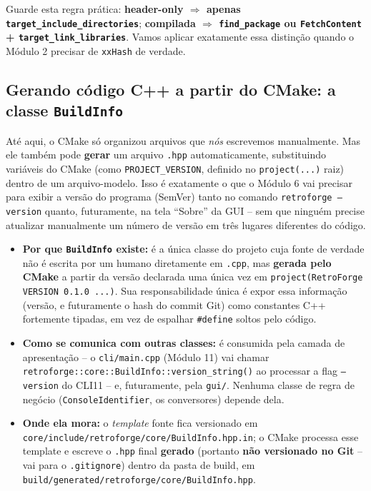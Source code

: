 \begin{CaixaInfo}
Guarde esta regra prática: \textbf{header-only $\Rightarrow$ apenas \texttt{target\_include\_directories}}; \textbf{compilada $\Rightarrow$ \texttt{find\_package} ou \texttt{FetchContent} + \texttt{target\_link\_libraries}}. Vamos aplicar exatamente essa distinção quando o Módulo 2 precisar de \texttt{xxHash} de verdade.
\end{CaixaInfo}

\subsection{Gerando código C++ a partir do CMake: a classe \texttt{BuildInfo}}
\label{sec:buildinfo}

Até aqui, o CMake só organizou arquivos que \textit{nós} escrevemos manualmente. Mas ele também pode \textbf{gerar} um arquivo \texttt{.hpp} automaticamente, substituindo variáveis do CMake (como \texttt{PROJECT\_VERSION}, definido no \texttt{project(...)} raiz) dentro de um arquivo-modelo. Isso é exatamente o que o Módulo 6 vai precisar para exibir a versão do programa (SemVer) tanto no comando \texttt{retroforge --version} quanto, futuramente, na tela ``Sobre'' da GUI -- sem que ninguém precise atualizar manualmente um número de versão em três lugares diferentes do código.

\begin{itemize}
    \item \textbf{Por que \texttt{BuildInfo} existe:} é a única classe do projeto cuja fonte de verdade não é escrita por um humano diretamente em \texttt{.cpp}, mas \textbf{gerada pelo CMake} a partir da versão declarada uma única vez em \texttt{project(RetroForge VERSION 0.1.0 ...)}. Sua responsabilidade única é expor essa informação (versão, e futuramente o hash do commit Git) como constantes C++ fortemente tipadas, em vez de espalhar \texttt{\#define} soltos pelo código.
    \item \textbf{Como se comunica com outras classes:} é consumida pela camada de apresentação -- o \texttt{cli/main.cpp} (Módulo 11) vai chamar \texttt{retroforge::core::BuildInfo::version\_string()} ao processar a flag \texttt{--version} do CLI11 -- e, futuramente, pela \texttt{gui/}. Nenhuma classe de regra de negócio (\texttt{ConsoleIdentifier}, os conversores) depende dela.
    \item \textbf{Onde ela mora:} o \textit{template} fonte fica versionado em \texttt{core/include/retroforge/core/BuildInfo.hpp.in}; o CMake processa esse template e escreve o \texttt{.hpp} final \textbf{gerado} (portanto \textbf{não versionado no Git} -- vai para o \texttt{.gitignore}) dentro da pasta de build, em \texttt{build/generated/retroforge/core/BuildInfo.hpp}.
\end{itemize}


